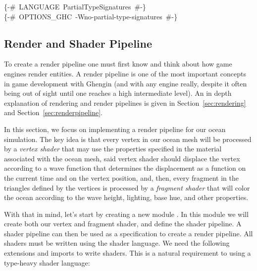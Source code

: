 \begin{hscode}\SaveRestoreHook
{}%
%
\>[B]{}\mbox{\enskip\{-\# LANGUAGE PartialTypeSignatures  \#-\}\enskip}{}\<[E]%
\\
\>[B]{}\mbox{\enskip\{-\# OPTIONS\_GHC -Wno-partial-type-signatures  \#-\}\enskip}{}\<[E]%
\ColumnHook
\end{hscode}\resethooks

\subsection{Render and Shader Pipeline}

To create a render pipeline one must first know and think about how game
engines render entities. A render pipeline is one of the most important
concepts in game development with Ghengin (and with any engine really, despite
it often being out of sight until one reaches a high intermediate level). An in
depth explanation of rendering and render pipelines is given in
Section~\ref{sec:rendering} and Section~\ref{sec:renderpipeline}.

In this section, we focus on implementing a render pipeline for our ocean
simulation. The key idea is that every vertex in our ocean mesh will be
processed by a \emph{vertex shader} that may use the properties specified in
the material associated with the ocean mesh, said vertex shader should displace
the vertex according to a wave function that determines the displacement as a
function on the current time and on the vertex position, and, then, every
fragment in the triangles defined by the vertices is processed by a
\emph{fragment shader} that will color the ocean according to the wave height,
lighting, base hue, and other properties.

With that in mind, let's start by creating a new module . In this
module we will create both our vertex and fragment shader, and define the shader
pipeline. A shader pipeline can then be used as a specification to create a
render pipeline. All shaders must be written using the  shader language. We
need the following extensions and imports to write  shaders. This is a
natural requirement to using a type-heavy shader language:

